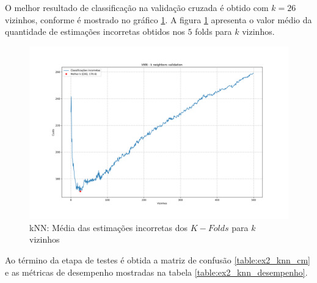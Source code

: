 \documentclass{article}
\begin{document}
    O melhor resultado de classificação na validação cruzada é obtido com $k=26$ vizinhos, conforme é mostrado no gráfico \ref{fig:ex2_b_knn}.
    A figura \ref{fig:ex2_b_knn} apresenta o valor médio da quantidade de estimações incorretas obtidos nos $5$ folds para $k$ vizinhos.
    \begin{figure}[H]
        \centering
        \includegraphics[width=\linewidth]{img2/knn.png}
        \caption{kNN: Média das estimações incorretas dos $K-Folds$ para $k$ vizinhos}
        \label{fig:ex2_b_knn}
    \end{figure}

    Ao término da etapa de testes é obtida a matriz de confusão \ref{table:ex2_knn_cm} e as métricas de desempenho mostradas
    na tabela \ref{table:ex2_knn_desempenho}.
\end{document}
